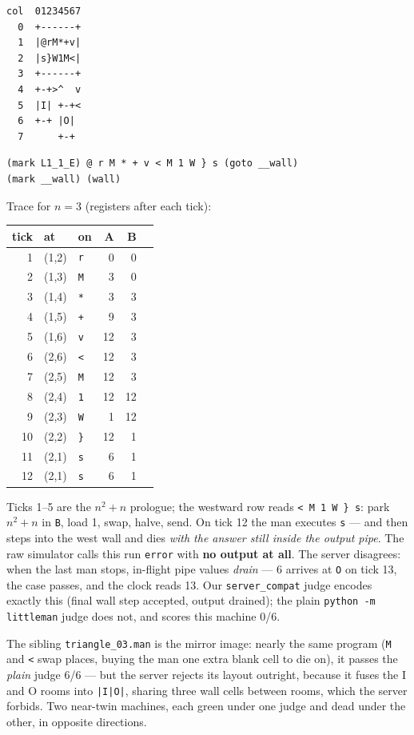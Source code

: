 \documentclass[11pt,a4paper]{article}
\newcommand{\op}[1]{\texttt{#1}}
\begin{document}
\begin{verbatim}
col  01234567
  0  +------+
  1  |@rM*+v|
  2  |s}W1M<|
  3  +------+
  4  +-+>^  v
  5  |I| +-+<
  6  +-+ |O|
  7      +-+
\end{verbatim}

\begin{verbatim}
(mark L1_1_E) @ r M * + v < M 1 W } s (goto __wall)
(mark __wall) (wall)
\end{verbatim}

Trace for $n=3$ (registers after each tick):

\begin{center}
\small
\begin{tabular}{r|llrrl}
tick & at & on & A & B & \\ \hline
1 & (1,2) & \texttt{r} & 0 & 0 & \\
2 & (1,3) & \texttt{M} & 3 & 0 & \\
3 & (1,4) & \texttt{*} & 3 & 3 & \\
4 & (1,5) & \texttt{+} & 9 & 3 & \\
5 & (1,6) & \texttt{v} & 12 & 3 & \\
6 & (2,6) & \texttt{<} & 12 & 3 & \\
7 & (2,5) & \texttt{M} & 12 & 3 & \\
8 & (2,4) & \texttt{1} & 12 & 12 & \\
9 & (2,3) & \texttt{W} & 1 & 12 & \\
10 & (2,2) & \texttt{\}} & 12 & 1 & \\
11 & (2,1) & \texttt{s} & 6 & 1 & \\
12 & (2,1) & \texttt{s} & 6 & 1 & \\
\end{tabular}
\end{center}

Ticks 1--5 are the $n^2+n$ prologue; the westward row reads
\op{<\,M\,1\,W\,\}\,s}: park $n^2+n$ in \op{B}, load 1, swap, halve,
send. On tick 12 the man executes \op{s} --- and then steps into the west
wall and dies \emph{with the answer still inside the output pipe}. The
raw simulator calls this run \texttt{error} with \textbf{no output at
all}. The server disagrees: when the last man stops, in-flight pipe
values \emph{drain} --- 6 arrives at \texttt{O} on tick 13, the case
passes, and the clock reads 13. Our \texttt{server\_compat} judge
encodes exactly this (final wall step accepted, output drained); the
plain \texttt{python -m littleman} judge does not, and scores this
machine 0/6.

The sibling \texttt{triangle\_03.man} is the mirror image: nearly the
same program (\op{M} and \op{<} swap places, buying the man one extra
blank cell to die on), it passes the \emph{plain} judge 6/6 --- but the
server rejects its layout outright, because it fuses the I and O rooms
into \texttt{|I|O|}, sharing three wall cells between rooms, which the
server forbids. Two near-twin machines, each green under one judge and
dead under the other, in opposite directions.
\end{document}
